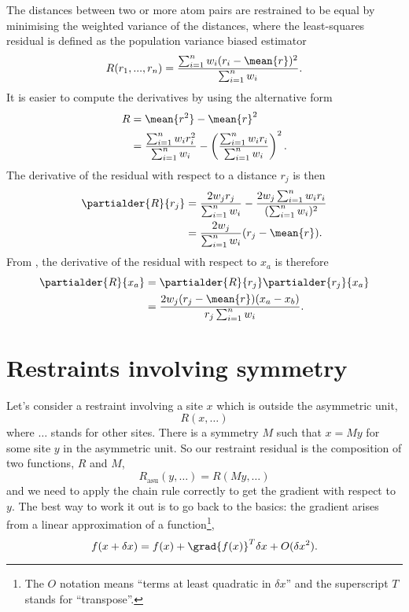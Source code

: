 \documentclass[11pt]{article}
\begin{document}
The distances between two or more atom pairs are restrained to be equal
by minimising the weighted variance of the distances, where the
least-squares residual is defined as the population variance biased estimator
\begin{equation}
R(r_1,...,r_n) = \frac{\sum_{i = 1}^n {w_i(r_i - \mean{r})^2}}
                      {\sum_{i = 1}^n {w_i}}.
\end{equation}
It is easier to compute the derivatives by using the alternative form
\begin{align}
R &= \mean{r^2} - \mean{r}^2 \nonumber\\
&= \frac{\sum_{i = 1}^n {w_i r_i^2}}{\sum_{i = 1}^n {w_i}} - 
    \left(\frac{\sum_{i = 1}^n {w_i r_i}}{\sum_{i = 1}^n {w_i}}\right)^2.
\end{align}
The derivative of the residual with respect to a distance $r_j$ is then
\begin{align}
\partialder{R}{r_j} &=
  \frac{2 w_j r_j}{\sum_{i=1}^n{w_i}}
  - \frac{2 w_j \sum_{i=1}^n w_i r_i}{(\sum_{i=1}^n w_i)^2}\nonumber\\
&= \frac{2 w_j}{\sum_{i=1}^n{w_i}}(r_j - \mean{r}).
\end{align}
From ,  the derivative of the residual with respect to $x_a$ is therefore
\begin{align}
\partialder{R}{x_a} &= \partialder{R}{r_j} \partialder{r_j}{x_a}\nonumber\\
&= \frac{2 w_j (r_j - \mean{r})(x_a - x_b)}{r_j \sum_{i=1}^n {w_i}}.
\end{align}

\section{Restraints involving symmetry}

Let's consider a restraint involving a site $x$ which is outside the asymmetric unit,
\begin{equation}
R(x, \ldots)
\end{equation}
where $\ldots$ stands for other sites. There is a symmetry $M$ such that $x=My$
for some site $y$ in the asymmetric unit. So our restraint residual is the
composition of two functions, $R$ and $M$,
\newcommand{\rasu}{R_{\text{asu}}}
\begin{equation}
\rasu(y, \ldots) = R(My, \ldots)
\end{equation}
and we need to apply the chain rule correctly to get the gradient with respect
to $y$. The best way to work it out is to go back to the basics: the gradient
arises from a linear approximation of a function\footnote{The $O$ notation means
``terms at least quadratic in $\delta x$'' and the superscript $T$ stands for ``transpose''.},
\begin{equation}
f(x + \delta x) = f(x) + \grad{f(x)}^T \delta x + O(\delta x^2).
\end{equation}
\end{document}
